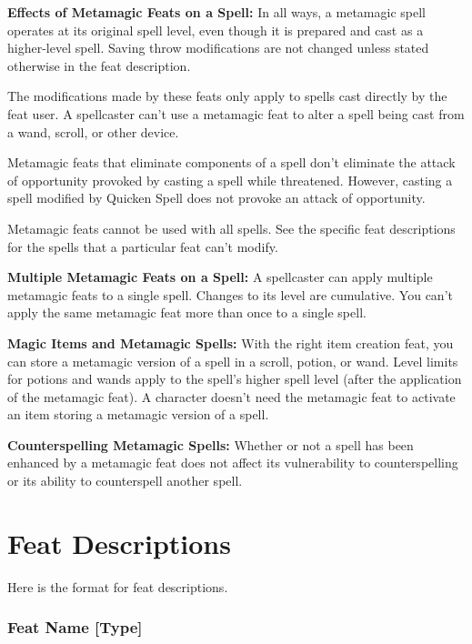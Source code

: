 \textbf{Effects of Metamagic Feats on a Spell:} In all ways, a metamagic spell 
operates at its original spell level, even though it is prepared and cast as a 
higher-level spell. Saving throw modifications are not changed unless stated otherwise 
in the feat description.

The modifications made by these feats only apply to spells cast directly by the 
feat user. A spellcaster can't use a metamagic feat to alter a spell being cast 
from a wand, scroll, or other device.

Metamagic feats that eliminate components of a spell don't eliminate the attack 
of opportunity provoked by casting a spell while threatened. However, casting a 
spell modified by Quicken Spell does not provoke an attack of opportunity.

Metamagic feats cannot be used with all spells. See the specific feat descriptions 
for the spells that a particular feat can't modify.

\textbf{Multiple Metamagic Feats on a Spell:} A spellcaster can apply multiple 
metamagic feats to a single spell. Changes to its level are cumulative. You can't 
apply the same metamagic feat more than once to a single spell.

\textbf{Magic Items and Metamagic Spells:} With the right item creation feat, you 
can store a metamagic version of a spell in a scroll, potion, or wand. Level limits 
for potions and wands apply to the spell's higher spell level (after the application 
of the metamagic feat). A character doesn't need the metamagic feat to activate 
an item storing a metamagic version of a spell.

\textbf{Counterspelling Metamagic Spells:} Whether or not a spell has been enhanced 
by a metamagic feat does not affect its vulnerability to counterspelling or its 
ability to counterspell another spell.

\section{Feat Descriptions}

Here is the format for feat descriptions.

\subsubsection{Feat Name [Type]}

